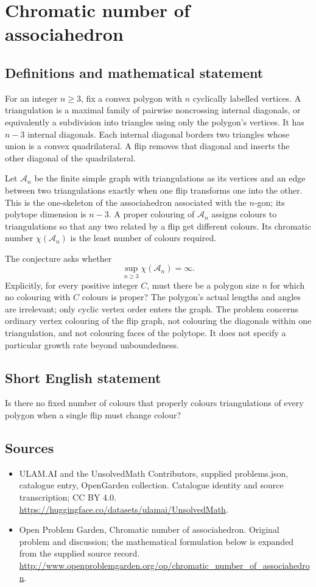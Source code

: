 \documentclass[11pt,a4paper]{article}
\begin{document}
\section*{Chromatic number of associahedron}\label{statement}

\subsection{Definitions and mathematical statement}
For an integer $n\ge3$, fix a convex polygon with $n$ cyclically labelled
vertices. A triangulation is a maximal family of pairwise noncrossing
internal diagonals, or equivalently a subdivision into triangles using
only the polygon's vertices. It has $n-3$ internal diagonals.
Each internal diagonal borders two triangles whose union is a convex
quadrilateral. A flip removes that diagonal and inserts the other diagonal
of the quadrilateral.

Let $\mathcal A_n$ be the finite simple graph with triangulations as its
vertices and an edge between two triangulations exactly when one flip
transforms one into the other. This is the one-skeleton of the associahedron
associated with the $n$-gon; its polytope dimension is $n-3$.
A proper colouring of $\mathcal A_n$ assigns colours to triangulations
so that any two related by a flip get different colours. Its chromatic
number $\chi(\mathcal A_n)$ is the least number of colours required.

The conjecture asks whether
\[
 \sup_{n\ge3}\chi(\mathcal A_n)=\infty.
\]
Explicitly, for every positive integer $C$, must there be a polygon size
$n$ for which no colouring with $C$ colours is proper? The polygon's
actual lengths and angles are irrelevant; only cyclic vertex order
enters the graph. The problem concerns ordinary vertex colouring of the
flip graph, not colouring the diagonals within one triangulation, and
not colouring faces of the polytope. It does not specify a particular
growth rate beyond unboundedness.
\subsection{Short English statement}
Is there no fixed number of colours that properly colours triangulations of every polygon when a single flip must change colour?
\subsection{Sources}
\begin{itemize}
\item[S1] ULAM.AI and the UnsolvedMath Contributors, supplied problems.json, catalogue entry, OpenGarden collection. Catalogue identity and source transcription; CC BY 4.0.
\url{https://huggingface.co/datasets/ulamai/UnsolvedMath}.
\item[S2] Open Problem Garden, Chromatic number of associahedron. Original problem and discussion; the mathematical formulation below is expanded from the supplied source record.
\url{http://www.openproblemgarden.org/op/chromatic_number_of_associahedron}.
\end{itemize}
\end{document}
